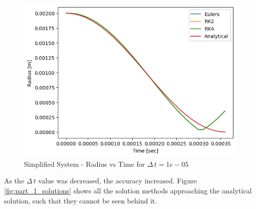\documentclass[12pt]{article}
\begin{document}
\begin{figure}[H]
    \centering
    \includegraphics[scale=0.75]{out/dt_variance/Question_1/dt_1e-05/combined_graph.png}
    \caption{Simplified System - Radius vs Time for $\Delta\,t = 1e-05$ }
    \label{fig:part_1_big_step}
\end{figure}

\noindent As the $\Delta \, t$ value was decreased, the accuracy increased. Figure \ref{fig:part_1_solutions} shows all the solution methods approaching the analytical solution, such that they cannot be seen behind it.
\end{document}
